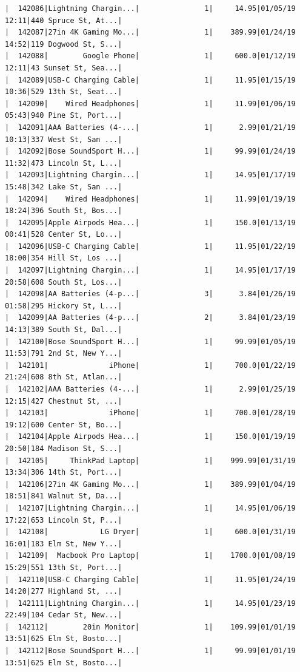\documentclass[
  letterpaper,
  DIV=11,
  numbers=noendperiod]{scrartcl}
\begin{document}
\begin{verbatim}
|  142086|Lightning Chargin...|               1|     14.95|01/05/19 12:11|440 Spruce St, At...|
|  142087|27in 4K Gaming Mo...|               1|    389.99|01/24/19 14:52|119 Dogwood St, S...|
|  142088|        Google Phone|               1|     600.0|01/12/19 12:11|43 Sunset St, Sea...|
|  142089|USB-C Charging Cable|               1|     11.95|01/15/19 10:36|529 13th St, Seat...|
|  142090|    Wired Headphones|               1|     11.99|01/06/19 05:43|940 Pine St, Port...|
|  142091|AAA Batteries (4-...|               1|      2.99|01/21/19 10:13|337 West St, San ...|
|  142092|Bose SoundSport H...|               1|     99.99|01/24/19 11:32|473 Lincoln St, L...|
|  142093|Lightning Chargin...|               1|     14.95|01/17/19 15:48|342 Lake St, San ...|
|  142094|    Wired Headphones|               1|     11.99|01/19/19 18:24|396 South St, Bos...|
|  142095|Apple Airpods Hea...|               1|     150.0|01/13/19 00:41|528 Center St, Lo...|
|  142096|USB-C Charging Cable|               1|     11.95|01/22/19 18:00|354 Hill St, Los ...|
|  142097|Lightning Chargin...|               1|     14.95|01/17/19 20:58|608 South St, Los...|
|  142098|AA Batteries (4-p...|               3|      3.84|01/26/19 01:58|295 Hickory St, L...|
|  142099|AA Batteries (4-p...|               2|      3.84|01/23/19 14:13|389 South St, Dal...|
|  142100|Bose SoundSport H...|               1|     99.99|01/05/19 11:53|791 2nd St, New Y...|
|  142101|              iPhone|               1|     700.0|01/22/19 21:24|608 8th St, Atlan...|
|  142102|AAA Batteries (4-...|               1|      2.99|01/25/19 12:15|427 Chestnut St, ...|
|  142103|              iPhone|               1|     700.0|01/28/19 19:12|600 Center St, Bo...|
|  142104|Apple Airpods Hea...|               1|     150.0|01/19/19 20:50|184 Madison St, S...|
|  142105|     ThinkPad Laptop|               1|    999.99|01/31/19 13:34|306 14th St, Port...|
|  142106|27in 4K Gaming Mo...|               1|    389.99|01/04/19 18:51|841 Walnut St, Da...|
|  142107|Lightning Chargin...|               1|     14.95|01/06/19 17:22|653 Lincoln St, P...|
|  142108|            LG Dryer|               1|     600.0|01/31/19 16:01|183 Elm St, New Y...|
|  142109|  Macbook Pro Laptop|               1|    1700.0|01/08/19 15:29|551 13th St, Port...|
|  142110|USB-C Charging Cable|               1|     11.95|01/24/19 14:20|277 Highland St, ...|
|  142111|Lightning Chargin...|               1|     14.95|01/23/19 22:49|104 Cedar St, New...|
|  142112|        20in Monitor|               1|    109.99|01/01/19 13:51|625 Elm St, Bosto...|
|  142112|Bose SoundSport H...|               1|     99.99|01/01/19 13:51|625 Elm St, Bosto...|

\end{verbatim}
\end{document}
